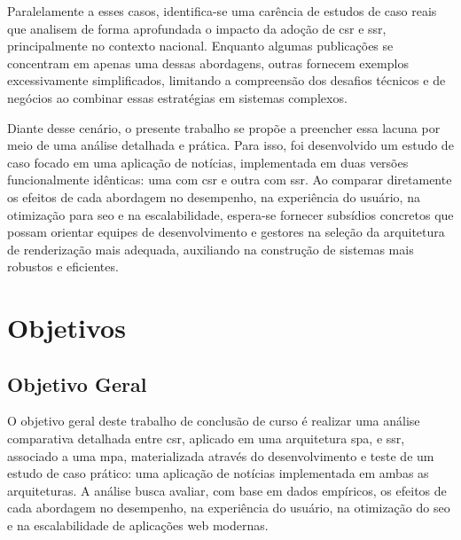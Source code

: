 Paralelamente a esses casos, identifica-se uma carência de estudos de caso reais que analisem de forma aprofundada o impacto da adoção de \acrshort{csr} e \acrshort{ssr}, principalmente no contexto nacional. Enquanto algumas publicações se concentram em apenas uma dessas abordagens, outras fornecem exemplos excessivamente simplificados, limitando a compreensão dos desafios técnicos e de negócios ao combinar essas estratégias em sistemas complexos.

Diante desse cenário, o presente trabalho se propõe a preencher essa lacuna por meio de uma análise detalhada e prática. Para isso, foi desenvolvido um estudo de caso focado em uma aplicação de notícias, implementada em duas versões funcionalmente idênticas: uma com \acrshort{csr} e outra com \acrshort{ssr}. Ao comparar diretamente os efeitos de cada abordagem no desempenho, na experiência do usuário, na otimização para \acrshort{seo} e na escalabilidade, espera-se fornecer subsídios concretos que possam orientar equipes de desenvolvimento e gestores na seleção da arquitetura de renderização mais adequada, auxiliando na construção de sistemas mais robustos e eficientes.
\section{Objetivos}

\subsection{Objetivo Geral}

O objetivo geral deste trabalho de conclusão de curso é realizar uma análise comparativa detalhada entre \acrfull{csr}, aplicado em uma arquitetura \acrfull{spa}, e \acrfull{ssr}, associado a uma \acrfull{mpa}, materializada através do desenvolvimento e teste de um estudo de caso prático: uma aplicação de notícias implementada em ambas as arquiteturas. A análise busca avaliar, com base em dados empíricos, os efeitos de cada abordagem no desempenho, na experiência do usuário, na otimização do \acrfull{seo} e na escalabilidade de aplicações web modernas.

